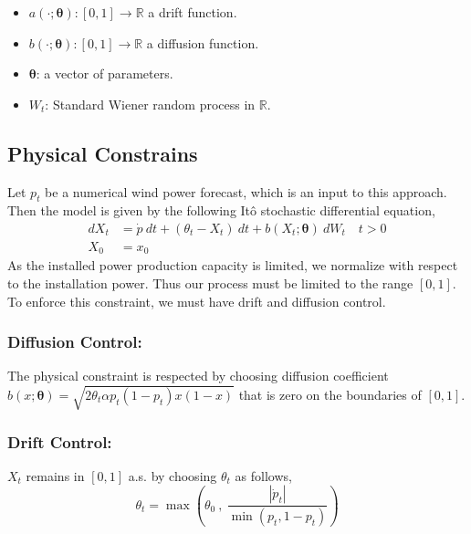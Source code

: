 \documentclass[ima, 20pt, portrait, plainboxedsections]{sciposter}
\newcommand{\R}{\mathbb{R}}
\begin{document}
\begin{multicols}{3}
\begin{itemize}
\item $a(\cdot; \bm{\theta}):[0,1] \to \R $  a drift function.
\item $b (\cdot; \bm{\theta} ):[0,1] \to \R$  a  diffusion function.
\item $\bm{\theta}$: a vector of parameters.
\item $W_t$: Standard Wiener random process in $\R$.
\end{itemize}

\subsection*{Physical Constrains}
Let $p_t$ be a numerical wind power forecast, which is an input to this approach. Then the model is given by the following It\^{o} stochastic differential equation,
\begin{equation}
\begin{split}
dX_t&= \dot{p} \ dt + (\theta_t -X_t) \ dt + b (X_t; \bm{\theta} ) \ dW_t \quad t > 0 \\
X_0&=x_0
\end{split}
\end{equation}
As the  installed power production capacity is limited, we normalize with respect to the installation power. Thus our process must be limited to the range $[0,1]$. To enforce this constraint, we must have drift and diffusion control.
\subsubsection*{Diffusion Control: } The physical constraint is respected  by choosing  diffusion coefficient $ b (x; \bm{\theta} )= \sqrt{2 \theta_t \alpha p_t(1-p_t) x (1-x)} $ that is zero on the boundaries of $[0,1]$.
\subsubsection*{Drift Control: }
$X_t$ remains in $[0,1]$ a.s. by choosing $\theta_t$ as follows, 
\begin{equation}
\theta_t = \max \left( \theta_0 \ , \ \frac{|\dot{p}_t|}{\min (p_t, 1-p_t)}  \right )
\end{equation}


\end{multicols}
\end{document}
